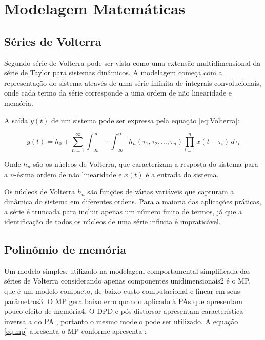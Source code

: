 \section{Modelagem Matemáticas}

\subsection*{Séries de Volterra}
Segundo \cite{Gonçalves2009} série de Volterra pode ser vista como uma extensão multidimensional da série de Taylor para sistemas dinâmicos. A modelagem começa com a representação do sistema através de uma série infinita de integrais convolucionais, onde cada termo da série corresponde a uma ordem de não linearidade e memória.

A saída \( y(t) \) de um sistema pode ser expressa pela equação \ref{eq:Volterra}:

\begin{equation}
    y(t) = h_0 + \sum_{n=1}^{\infty} \int_{-\infty}^{\infty} \cdots \int_{-\infty}^{\infty} h_n(\tau_1, \tau_2, \ldots, \tau_n) \prod_{i=1}^{n} x(t - \tau_i) \, d\tau_i
    \label{eq:Volterra}
\end{equation}

Onde \( h_n \) são os núcleos de Volterra, que caracterizam a resposta do sistema para a \( n \)-ésima ordem de não linearidade e \( x(t) \) é a entrada do sistema.

Os núcleos de Volterra \( h_n \) são funções de várias variáveis que capturam a dinâmica do sistema em diferentes ordens. Para a maioria das aplicações práticas, a série é truncada para incluir apenas um número finito de termos, já que a identificação de todos os núcleos de uma série infinita é impraticável.

\subsection*{Polinômio de memória}

Um modelo simples, utilizado na modelagem comportamental simpliﬁcada das séries de Volterra considerando apenas componentes unidimensionais2 é o MP, que é um modelo compacto, de baixo custo computacional e linear em
seus parâmetros3. O MP gera baixo erro quando aplicado à PAs que apresentam pouco efeito de memória4. O DPD e pós distorsor apresentam característica inversa a do PA \cite{Schuartz2017}, portanto o mesmo modelo pode ser utilizado. A equação \ref{eq:mp} apresenta o MP conforme apresenta \cite{Schuartz2017}: 

